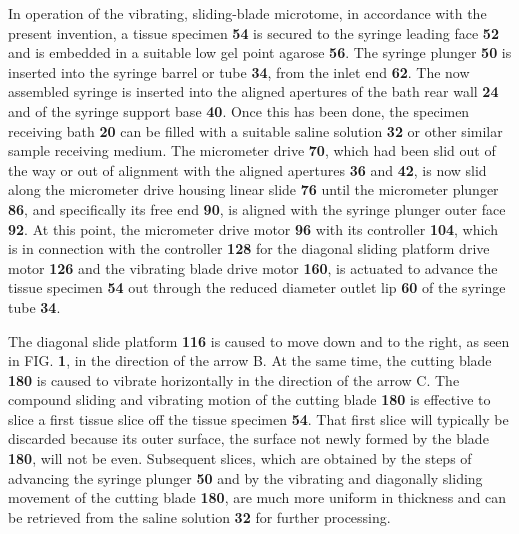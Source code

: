 \documentclass{article}
\begin{document}
In operation of the vibrating, sliding-blade microtome, in accordance with the present invention, a tissue specimen \textbf{54} is secured to the syringe leading face \textbf{52} and is embedded in a suitable low gel point agarose \textbf{56}. The syringe plunger \textbf{50} is inserted into the syringe barrel or tube \textbf{34}, from the inlet end \textbf{62}. The now assembled syringe is inserted into the aligned apertures of the bath rear wall \textbf{24} and of the syringe support base \textbf{40}. Once this has been done, the specimen receiving bath \textbf{20} can be filled with a suitable saline solution \textbf{32} or other similar sample receiving medium. The micrometer drive \textbf{70}, which had been slid out of the way or out of alignment with the aligned apertures \textbf{36} and \textbf{42}, is now slid along the micrometer drive housing linear slide \textbf{76} until the micrometer plunger \textbf{86}, and specifically its free end \textbf{90}, is aligned with the syringe plunger outer face \textbf{92}. At this point, the micrometer drive motor \textbf{96} with its controller \textbf{104}, which is in connection with the controller \textbf{128} for the diagonal sliding platform drive motor \textbf{126} and the vibrating blade drive motor \textbf{160}, is actuated to advance the tissue specimen \textbf{54} out through the reduced diameter outlet lip \textbf{60} of the syringe tube \textbf{34}.

The diagonal slide platform \textbf{116} is caused to move down and to the right, as seen in FIG. \textbf{1}, in the direction of the arrow B. At the same time, the cutting blade \textbf{180} is caused to vibrate horizontally in the direction of the arrow C. The compound sliding and vibrating motion of the cutting blade \textbf{180} is effective to slice a first tissue slice off the tissue specimen \textbf{54}. That first slice will typically be discarded because its outer surface, the surface not newly formed by the blade \textbf{180}, will not be even. Subsequent slices, which are obtained by the steps of advancing the syringe plunger \textbf{50} and by the vibrating and diagonally sliding movement of the cutting blade \textbf{180}, are much more uniform in thickness and can be retrieved from the saline solution \textbf{32} for further processing.
\end{document}
